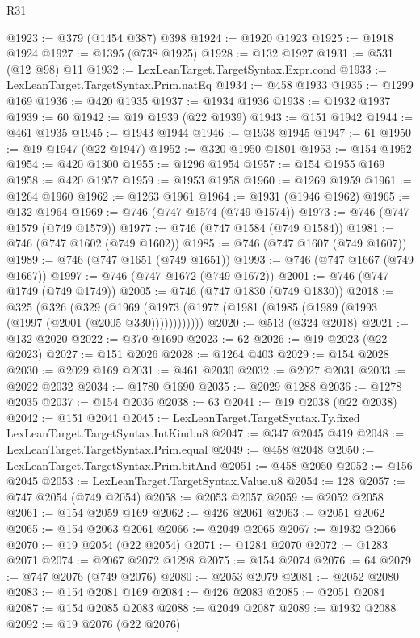 \begin{lexlean}{R31}
\begin{coremodule}
@1923 := @379 (@1454 @387) @398
@1924 := @1920 @1923
@1925 := @1918 @1924
@1927 := @1395 (@738 @1925)
@1928 := @132 @1927
@1931 := @531 (@12 @98) @11
@1932 := LexLeanTarget.TargetSyntax.Expr.cond
@1933 := LexLeanTarget.TargetSyntax.Prim.natEq
@1934 := @458 @1933
@1935 := @1299 @169
@1936 := @420 @1935
@1937 := @1934 @1936
@1938 := @1932 @1937
@1939 := 60
@1942 := @19 @1939 (@22 @1939)
@1943 := @151 @1942
@1944 := @461 @1935
@1945 := @1943 @1944
@1946 := @1938 @1945
@1947 := 61
@1950 := @19 @1947 (@22 @1947)
@1952 := @320 @1950 @1801
@1953 := @154 @1952
@1954 := @420 @1300
@1955 := @1296 @1954
@1957 := @154 @1955 @169
@1958 := @420 @1957
@1959 := @1953 @1958
@1960 := @1269 @1959
@1961 := @1264 @1960
@1962 := @1263 @1961
@1964 := @1931 (@1946 @1962)
@1965 := @132 @1964
@1969 := @746 (@747 @1574 (@749 @1574))
@1973 := @746 (@747 @1579 (@749 @1579))
@1977 := @746 (@747 @1584 (@749 @1584))
@1981 := @746 (@747 @1602 (@749 @1602))
@1985 := @746 (@747 @1607 (@749 @1607))
@1989 := @746 (@747 @1651 (@749 @1651))
@1993 := @746 (@747 @1667 (@749 @1667))
@1997 := @746 (@747 @1672 (@749 @1672))
@2001 := @746 (@747 @1749 (@749 @1749))
@2005 := @746 (@747 @1830 (@749 @1830))
@2018 := @325
    (@326
      (@329 (@1969 (@1973 (@1977 (@1981 (@1985 (@1989 (@1993 (@1997 (@2001 (@2005 @330))))))))))))
@2020 := @513 (@324 @2018)
@2021 := @132 @2020
@2022 := @370 @1690
@2023 := 62
@2026 := @19 @2023 (@22 @2023)
@2027 := @151 @2026
@2028 := @1264 @403
@2029 := @154 @2028
@2030 := @2029 @169
@2031 := @461 @2030
@2032 := @2027 @2031
@2033 := @2022 @2032
@2034 := @1780 @1690
@2035 := @2029 @1288
@2036 := @1278 @2035
@2037 := @154 @2036
@2038 := 63
@2041 := @19 @2038 (@22 @2038)
@2042 := @151 @2041
@2045 := LexLeanTarget.TargetSyntax.Ty.fixed LexLeanTarget.TargetSyntax.IntKind.u8
@2047 := @347 @2045 @419
@2048 := LexLeanTarget.TargetSyntax.Prim.equal
@2049 := @458 @2048
@2050 := LexLeanTarget.TargetSyntax.Prim.bitAnd
@2051 := @458 @2050
@2052 := @156 @2045
@2053 := LexLeanTarget.TargetSyntax.Value.u8
@2054 := 128
@2057 := @747 @2054 (@749 @2054)
@2058 := @2053 @2057
@2059 := @2052 @2058
@2061 := @154 @2059 @169
@2062 := @426 @2061
@2063 := @2051 @2062
@2065 := @154 @2063 @2061
@2066 := @2049 @2065
@2067 := @1932 @2066
@2070 := @19 @2054 (@22 @2054)
@2071 := @1284 @2070
@2072 := @1283 @2071
@2074 := @2067 @2072 @1298
@2075 := @154 @2074
@2076 := 64
@2079 := @747 @2076 (@749 @2076)
@2080 := @2053 @2079
@2081 := @2052 @2080
@2083 := @154 @2081 @169
@2084 := @426 @2083
@2085 := @2051 @2084
@2087 := @154 @2085 @2083
@2088 := @2049 @2087
@2089 := @1932 @2088
@2092 := @19 @2076 (@22 @2076)

\end{coremodule}
\end{lexlean}
